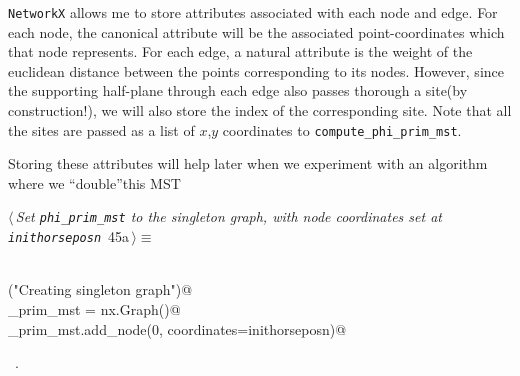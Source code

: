 \documentclass[11.5pt]{report}
\begin{document}
\begin{center}
\end{center}
\label{fig:animating-growth-of-phi-prim-mst}

\newchunk \verb|NetworkX| allows me to store attributes associated with each node 
and edge. For each node, the canonical attribute will be the associated point-coordinates 
which that node represents. For each edge, a natural attribute is the weight of the 
euclidean distance between the points corresponding to its nodes. However, since the 
supporting half-plane through each edge also passes thorough a site(by construction!), 
we will also store the index of the corresponding site. Note that all the sites are passed 
as a list of $x$,$y$ coordinates to \verb|compute_phi_prim_mst|. 

Storing these attributes will help later when we experiment with an algorithm where 
we ``double''this MST
\begin{flushleft} \small
\begin{minipage}{\linewidth}\label{scrap62}\raggedright\small
{} $\langle\,${\itshape Set \verb|phi_prim_mst| to the singleton graph, with node coordinates set at \verb|inithorseposn|}\nobreak\ {\footnotesize {45a}}$\,\rangle\equiv$
\vspace{-1ex}
\begin{list}{}{} \item
\mbox{}\verb@@\\
\mbox{}\verb@info("Creating singleton graph")@\\
\mbox{}\verb@phi_prim_mst = nx.Graph()@\\
\mbox{}\verb@phi_prim_mst.add_node(0, coordinates=inithorseposn)@\\
\mbox{}\verb@@{\NWsep}
\end{list}
\vspace{-1.5ex}
\footnotesize
\begin{list}{}{\setlength{\itemsep}{-\parsep}\setlength{\itemindent}{-\leftmargin}}
\item \NWtxtMacroRefIn\ .

\item{}
\end{list}
\end{minipage}\vspace{4ex}
\end{flushleft}
\end{document}
